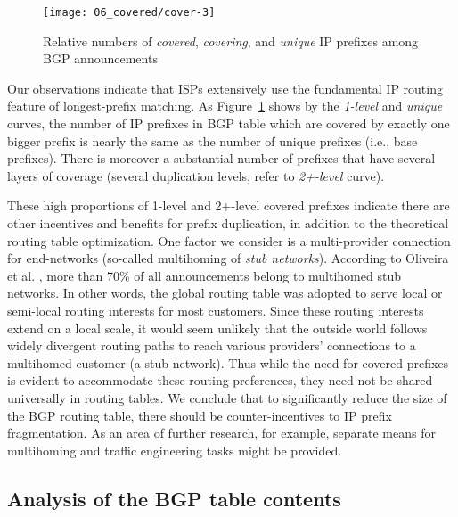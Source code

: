 \begin{figure}[htbp]
	\centering
		\texttt{[image: 06\_covered/cover-3]}
	\caption{Relative numbers of \emph{covered}, \emph{covering}, and \emph{unique} IP prefixes among BGP announcements}
	\label{fig:covered}
\end{figure}

Our observations indicate that ISPs extensively use the fundamental IP routing
feature of longest-prefix matching. As Figure~\ref{fig:covered} shows by the
\emph{1-level} and \emph{unique} curves, the number of IP prefixes in BGP table
which are covered by exactly one bigger prefix is nearly the same as the number
of unique prefixes (i.e., base prefixes). There is moreover a substantial
number of prefixes that have several layers of coverage (several duplication
levels, refer to \emph{2+-level} curve).

These high proportions of 1-level and 2+-level covered prefixes indicate there
are other incentives and benefits for prefix duplication, in addition to the
theoretical routing table optimization. One factor we consider is a
multi-provider connection for end-networks (so-called multihoming of \emph{stub
networks}). According to Oliveira et al.
\cite{Oliveira:2007:Observing-the-evolution}, more than 70\% of all
announcements belong to multihomed stub networks. In other words, the global
routing table was adopted to serve local or semi-local routing interests for
most customers. Since these routing interests extend on a local scale, it would
seem unlikely that the outside world follows widely divergent routing paths to
reach various providers' connections to a multihomed customer (a stub network).
Thus while the need for covered prefixes is evident to accommodate these
routing preferences, they need not be shared universally in routing tables. We
conclude that to significantly reduce the size of the BGP routing table, there
should be counter-incentives to IP prefix fragmentation. As an area of further
research, for example, separate means for multihoming and traffic engineering
tasks might be provided.

\subsection{Analysis of the BGP table contents}


